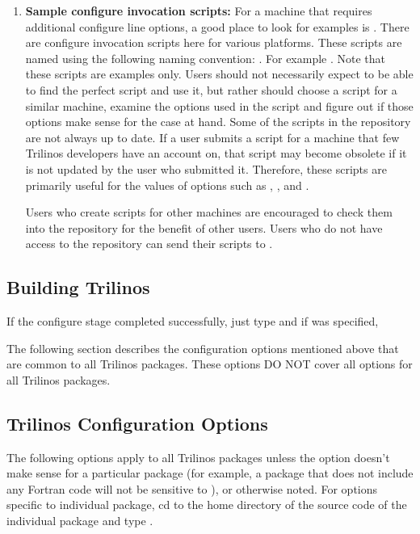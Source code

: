 \documentclass[12pt,strict]{TrilinosDevGuide}
\begin{document}
\begin{enumerate}
\item {\bf Sample configure invocation scripts:}
For a machine that requires additional configure line options, a good 
place to look for examples is  \newline
{}.  There are 
configure invocation scripts here for various platforms.  These scripts are 
named using the following naming convention:
.
For example .  Note that these scripts are 
examples only.  Users should not necessarily expect to be able to find the 
perfect script and use it, but rather should choose a script for a similar 
machine, examine the options used in the script and figure out if those 
options make sense for the case at hand.  Some of the scripts in the 
repository are not always up to date.  If a user submits a script for a 
machine that few Trilinos developers have an account on, that script may 
become obsolete if it is not updated by the user who submitted it.  Therefore, 
these scripts are primarily useful for the values of options such as 
, , 
and .  

Users who create scripts for other machines are encouraged to check them into 
the repository for the benefit of other users.  Users who do not have access to
the repository can send their scripts to .
\end{enumerate}

\subsection{Building Trilinos}

If the configure stage completed successfully, just type 
 and if 
 was specified, 

The following section describes the configuration options mentioned above that 
are common to all Trilinos packages.  These options DO NOT cover all options 
for all Trilinos packages.

\subsection{Trilinos Configuration Options}
\label{subsect:TrilinosConfigOptions}
The following options apply to all Trilinos packages unless 
the option doesn't make sense for a particular package (for example, a 
package that does not include any Fortran code will not be sensitive to 
), or otherwise noted.  For options specific to 
individual package, cd to the home directory of the source code of the 
individual package and type .
\end{document}
